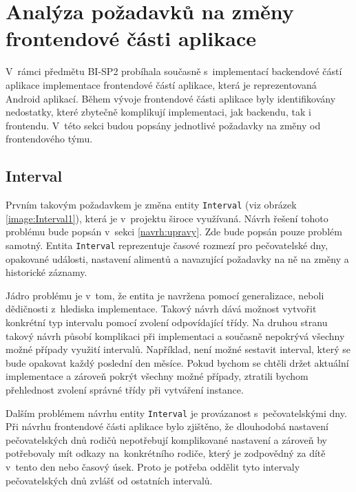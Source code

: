\section{Analýza požadavků na změny frontendové části aplikace}\label{analyza:pozadavky-frontendu}
    V~rámci předmětu BI-SP2 probíhala současně s~implementací backendové částí aplikace implementace frontendové částí aplikace, která je reprezentovaná Android aplikací. Během vývoje frontendové části aplikace byly identifikovány nedostatky, které zbytečně komplikují implementaci, jak backendu, tak i frontendu. V~této sekci budou popsány jednotlivé požadavky na změny od frontendového týmu.
    
    \subsection{Interval}\label{analyza:pozadavky:interval}
        Prvním takovým požadavkem je změna entity \verb|Interval| (viz obrázek \ref{image:Interval1}), která je v~projektu široce využívaná. Návrh řešení tohoto problému bude popsán v~sekci \ref{navrh:upravy}. Zde bude popsán pouze problém samotný. Entita \verb|Interval| reprezentuje časové rozmezí pro pečovatelské dny, opakované události, nastavení alimentů a navazující požadavky na ně na změny a historické záznamy.
            
        Jádro problému je v~tom, že entita je navržena pomocí generalizace, neboli dědičnosti z~hlediska implementace. Takový návrh dává možnost vytvořit konkrétní typ intervalu pomocí zvolení odpovídající třídy. Na druhou stranu takový návrh působí komplikaci při implementaci a současně nepokrývá všechny možné případy využití intervalů. Například, není možné sestavit interval, který se bude opakovat každý poslední den měsíce. Pokud bychom se chtěli držet aktuální implementace a zároveň pokrýt všechny možné případy, ztratili bychom přehlednost zvolení správné třídy při vytváření instance.
            
        Dalším problémem návrhu entity \verb|Interval| je provázanost s~pečovatelskými dny. Při návrhu frontendové části aplikace bylo zjištěno, že dlouhodobá nastavení pečovatelských dnů rodičů nepotřebují komplikované nastavení a zároveň by potřebovaly mít odkazy na~konkrétního rodiče, který je zodpovědný za dítě v~tento den nebo časový úsek. Proto je potřeba oddělit tyto intervaly pečovatelských dnů zvlášť od ostatních intervalů.
    

